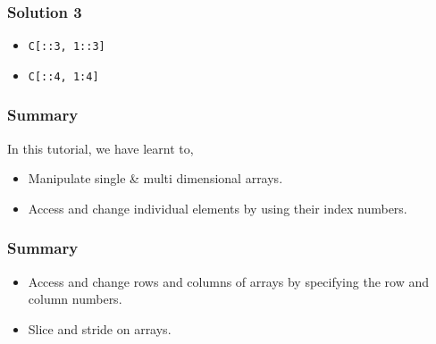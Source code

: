 \documentclass[17pt]{beamer}
\begin{document}
\begin{frame}[fragile]
\frametitle{Solution 3}
\label{sec-12}

\begin{itemize}
\item \texttt{C[::3, 1::3]}\pause
\item \texttt{C[::4, 1:4]}
\end{itemize}

\end{frame}
\begin{frame}
\frametitle{Summary}
\label{sec-13}

  In this tutorial, we have learnt to, \pause

\begin{itemize}
\item Manipulate single \& multi dimensional arrays.\pause
\item Access and change individual elements by using their index numbers.
\end{itemize}
\end{frame}

\begin{frame}
\frametitle{Summary}
\label{sec-13}

\begin{itemize}
\item Access and change rows and columns of arrays by specifying the row 
    and column numbers.\pause
\item Slice and stride on arrays.
\end{itemize}
\end{frame}
\end{document}

